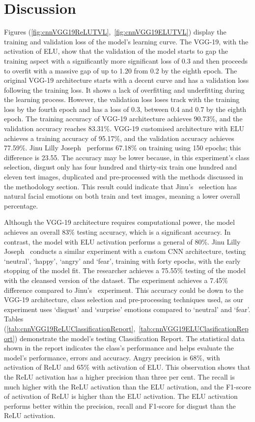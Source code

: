 \documentclass[conference]{IEEEtran}
\begin{document}
    \section{Discussion}
      Figures (\ref{fig:cnnVGG19ReLUTVL},~\ref{fig:cnnVGG19ELUTVL}) display the training and validation loss of the model's learning curve. The VGG-19, with the activation of ELU, show that the validation of the model starts to gap the training aspect with a significantly more significant loss of 0.3 and then proceeds to overfit with a massive gap of up to 1.20 from 0.2 by the eighth epoch. The original VGG-19 architecture starts with a decent curve and has a validation loss following the training loss. It shows a lack of overfitting and underfitting during the learning process. However, the validation loss loses track with the training loss by the fourth epoch and has a loss of 0.3, between 0.4 and 0.7 by the eighth epoch. The training accuracy of VGG-19 architecture achieves 90.73\%, and the validation accuracy reaches 83.31\%. VGG-19 customised architecture with ELU achieves a training accuracy of 95.17\%, and the validation accuracy achieves 77.59\%. Jinu Lilly Joseph~\cite{joseph_facial_2021} performs 67.18\% on training using 150 epochs; this difference is 23.55. The accuracy may be lower because, in this experiment's class selection, disgust only has four hundred and thirty-six train one hundred and eleven test images, duplicated and pre-processed with the methods discussed in the methodology section. This result could indicate that Jinu's~\cite{joseph_facial_2021} selection has natural facial emotions on both train and test images, meaning a lower overall percentage.

      Although the VGG-19 architecture requires computational power, the model achieves an overall 83\% testing accuracy, which is a significant accuracy. In contrast, the model with ELU activation performs a general of 80\%. Jinu Lilly Joseph~\cite{joseph_facial_2021} conducts a similar experiment with a custom CNN architecture, testing `neutral', `happy', `angry' and `fear', training with forty epochs, with the early stopping of the model fit. The researcher achieves a 75.55\% testing of the model with the cleansed version of the dataset. The experiment achieves a 7.45\% difference compared to Jinu's~\cite{joseph_facial_2021} experiment. This accuracy could be down to the VGG-19 architecture, class selection and pre-processing techniques used, as our experiment uses `disgust' and `surprise' emotions compared to `neutral' and `fear'. 
      Tables (\ref{tab:cnnVGG19ReLUClassificationReport},~\ref{tab:cnnVGG19ELUClasificationReport}) demonstrate the model's testing Classification Report. The statistical data shown in the report indicates the class's performance and helps evaluate the model's performance, errors and accuracy. Angry precision is 68\%, with activation of ReLU and 65\% with activation of ELU. This observation shows that the ReLU activation has a higher precision than three per cent. The recall is much higher with the ReLU activation than the ELU activation, and the F1-score of activation of ReLU is higher than the ELU activation. The ELU activation performs better within the precision, recall and F1-score for disgust than the ReLU activation.
\end{document}
